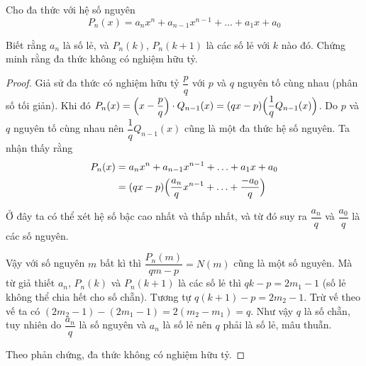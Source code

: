 \begin{problem}[Bài 10]
    Cho đa thức với hệ số nguyên
    \[P_n(x) = a_n x^n + a_{n-1} x^{n-1} + \ldots + a_1 x + a_0\]

    Biết rằng $a_n$ là số lẻ, và $P_n(k)$, $P_n(k+1)$ là các số
    lẻ với $k$ nào đó. Chứng minh rằng đa thức không có nghiệm hữu tỷ.
\end{problem}

\begin{proof}
    Giả sử đa thức có nghiệm hữu tỷ $\dfrac{p}{q}$ với $p$ và $q$
    nguyên tố cùng nhau (phân số tối giản). Khi đó 
    $P_n(x) = \Bigl(x - \dfrac{p}{q}\Bigr) \cdot Q_{n-1}(x)
    = (qx - p) \Bigl(\dfrac{1}{q} Q_{n-1}(x)\Bigr)$.
    Do $p$ và $q$ nguyên tố cùng nhau nên $\dfrac{1}{q} Q_{n-1}(x)$
    cũng là một đa thức hệ số nguyên. Ta nhận thấy rằng
    \begin{align*}
        P_n(x) & = a_n x^n + a_{n-1} x^{n-1} + \ldots + a_1 x + a_0 \\
    & = (qx - p) \Bigl(\dfrac{a_n}{q} x^{n-1} + \ldots + \dfrac{-a_0}{q}\Bigr)
    \end{align*}
    
    Ở đây ta có thể xét hệ số bậc cao nhất và thấp nhất, và từ
    đó suy ra $\dfrac{a_n}{q}$ và $\dfrac{a_0}{q}$ là các số nguyên.

    Vậy với số nguyên $m$ bất kì thì $\dfrac{P_n(m)}{qm - p} = N(m)$
    cũng là một số nguyên. Mà từ giả thiết $a_n$, $P_n(k)$ và 
    $P_n(k+1)$ là các số lẻ thì $qk - p = 2m_1 - 1$ (số lẻ không
    thể chia hết cho số chẵn). Tương tự $q(k+1) - p = 2m_2 - 1$.
    Trừ vế theo vế ta có $(2m_2 - 1) - (2m_1 - 1) = 
    2 (m_2 - m_1) = q$. Như vậy $q$ là số chẵn, tuy nhiên do 
    $\dfrac{a_n}{q}$ là số nguyên và $a_n$ là số lẻ nên $q$ 
    phải là số lẻ, mâu thuẫn. 

    Theo phản chứng, đa thức không có nghiệm hữu tỷ.
\end{proof}